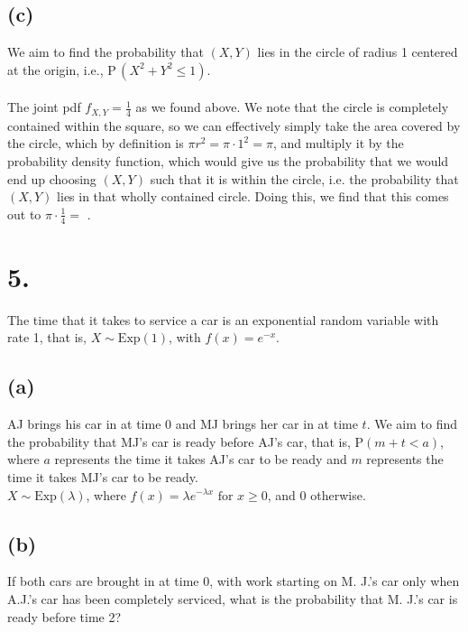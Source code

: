\documentclass{article}
\begin{document}
{\subsection*{(c)}
We aim to find the probability that $(X, Y)$ lies in the circle of radius 1 centered at the origin, i.e., $\mathrm P \,(X^2 + Y^ 2 \le 1)$. \\ \\ 
The joint pdf $f_{X, Y} = \frac{1}{4}$ as we found above. We note that the circle is completely contained within the square, so we can effectively simply take the area covered by the circle, which by definition is $\pi r^2 = \pi \cdot 1^2 = \pi$, and multiply it by the probability density function, which would give us the probability that we would end up choosing $(X, Y)$ such that it is within the circle, i.e. the probability that $(X, Y)$ lies in that wholly contained circle. Doing this, we find that this comes out to $\pi \cdot \frac{1}{4} = $ .

}

\section*{5.}
{\Large 
The time that it takes to service a car is an exponential random variable with rate 1, that is, $X \sim \text{Exp}(1)$, with $f(x) = e^{-x}$.

\subsection*{(a)}
AJ brings his car in at time 0 and MJ brings her car in at time $t$. We aim to find the probability that MJ’s car is ready before AJ’s car, that is, P$(m + t < a)$, where $a$ represents the time it takes AJ's car to be ready and $m$ represents the time it takes MJ's car to be ready. \\
$X \sim \text{Exp}(\lambda)$, where $f(x) = \lambda e^{-\lambda x} \text{ for } x \geq 0$, and 0 otherwise. \\ 



\subsection*{(b)}
If both cars are brought in at time 0, with work starting on M. J.’s car only when A.J.’s
car has been completely serviced, what is the probability that M. J.’s car is ready before
time 2?


}
\end{document}
